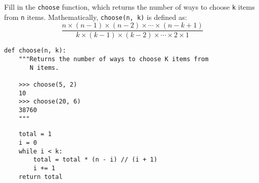 \question Fill in the \texttt{choose} function, which returns the number of ways to
choose \texttt{k} items from \texttt{n} items. Mathematically,
\texttt{choose(n, k)} is defined as:
\begin{equation*}
  \frac{n \times (n-1) \times (n-2) \times \cdots \times (n-k+1)}{k \times (k-1)
  \times (k-2) \times \cdots \times 2 \times 1}
\end{equation*}

\begin{lstlisting}
def choose(n, k):
    """Returns the number of ways to choose K items from
       N items.

    >>> choose(5, 2)
    10
    >>> choose(20, 6)
    38760
    """
\end{lstlisting}
\begin{solution}[2in]
\begin{lstlisting}
    total = 1
    i = 0
    while i < k:
        total = total * (n - i) // (i + 1)
        i += 1
    return total
\end{lstlisting}
\end{solution}
